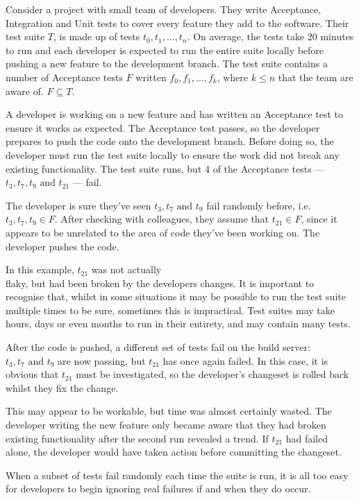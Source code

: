 Consider a project with small team of developers. They write Acceptance, Integration and Unit tests to cover every feature they add to the software. Their test suite $T$, is made up of tests $t_{0}, t_{1}, \dots, t_{n}$. On average, the tests take 20 minutes to run and each developer is expected to run the entire suite locally before pushing a new feature to the development branch. The test suite contains a number of \flaky{} Acceptance tests $F$ written $f_{0}, f_{1}, \dots, f_{k} \text{, where $k \leq n$}$ that the team are aware of. $F \subseteq T$.

A developer is working on a new feature and has written an Acceptance test to ensure it works as expected. The Acceptance test passes, so the developer prepares to push the code onto the development branch. Before doing so, the developer must run the test suite locally to ensure the work did not break any existing functionality. The test suite runs, but 4 of the Acceptance tests --- $t_{3}, t_{7}, t_{9} \text{ and } t_{21}$ --- fail.

The developer is sure they’ve seen $t_{3}, t_{7} \text{ and } t_{9}$ fail randomly before, i.e. $t_{3}, t_{7}, t_{9} \in F$. After checking with colleagues, they assume that $t_{21} \in F$, since it appears to be unrelated to the area of code they’ve been working on. The developer pushes the code.

In this example, $t_{21}$ was not actually \\flaky{}, but had been broken by the developers changes. It is important to recognise that, whilst in some situations it may be possible to run the test suite multiple times to be sure, sometimes this is impractical. Test suites may take hours, days or even months to run in their entirety, and may contain many \flaky{} tests.

After the code is pushed, a different set of tests fail on the build server: $t_{3}, t_{7} \text{ and } t_{9}$ are now passing, but $t_{21}$ has once again failed. In this case, it is obvious that $t_{21}$ must be investigated, so the developer’s changeset is rolled back whilst they fix the change.

This may appear to be workable, but time was almost certainly wasted. The developer writing the new feature only became aware that they had broken existing functionality after the second run revealed a trend. If $t_{21}$ had failed alone, the developer would have taken action before committing the changeset.

When a subset of tests fail randomly each time the suite is run, it is all too easy for developers to begin ignoring real failures if and when they do occur.


